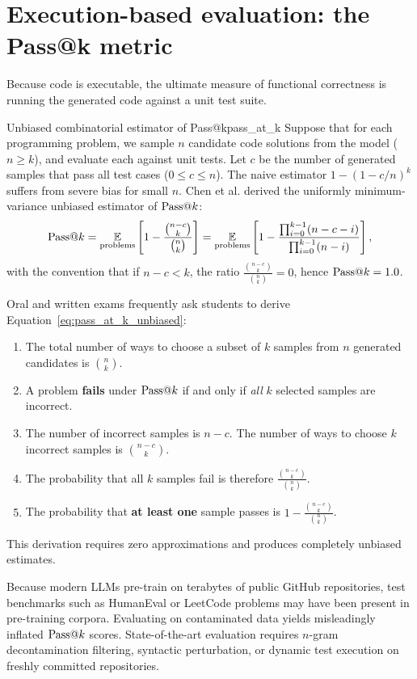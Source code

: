 \documentclass[../../main.tex]{subfiles}
\begin{document}
\section{Execution-based evaluation: the Pass@k metric}
Because code is executable, the ultimate measure of functional correctness is running the generated code against a unit test suite.

\begin{theorem}{Unbiased combinatorial estimator of Pass@k}{pass_at_k}
Suppose that for each programming problem, we sample $n$ candidate code solutions from the model ($n \ge k$), and evaluate each against unit tests. Let $c$ be the number of generated samples that pass all test cases ($0 \le c \le n$).
The naive estimator $1 - (1 - c/n)^k$ suffers from severe bias for small $n$. Chen et al. \citep{chen2021codex} derived the uniformly minimum-variance unbiased estimator of $\mathrm{Pass}@k$:
\begin{equation}
\label{eq:pass_at_k_unbiased}
\mathrm{Pass}@k = \operatorname*{\mathbb{E}}_{\text{problems}} \left[ 1 - \frac{\binom{n - c}{k}}{\binom{n}{k}} \right] = \operatorname*{\mathbb{E}}_{\text{problems}} \left[ 1 - \frac{\prod_{i=0}^{k-1} (n - c - i)}{\prod_{i=0}^{k-1} (n - i)} \right],
\end{equation}
with the convention that if $n - c < k$, the ratio $\frac{\binom{n-c}{k}}{\binom{n}{k}} = 0$, hence $\mathrm{Pass}@k = 1.0$.
\end{theorem}

\begin{examinsight}
Oral and written exams frequently ask students to derive Equation~\eqref{eq:pass_at_k_unbiased}:
\begin{enumerate}
    \item The total number of ways to choose a subset of $k$ samples from $n$ generated candidates is $\binom{n}{k}$.
    \item A problem \textbf{fails} under $\mathrm{Pass}@k$ if and only if \emph{all} $k$ selected samples are incorrect.
    \item The number of incorrect samples is $n - c$. The number of ways to choose $k$ incorrect samples is $\binom{n-c}{k}$.
    \item The probability that all $k$ samples fail is therefore $\frac{\binom{n-c}{k}}{\binom{n}{k}}$.
    \item The probability that \textbf{at least one} sample passes is $1 - \frac{\binom{n-c}{k}}{\binom{n}{k}}$.
\end{enumerate}
This derivation requires zero approximations and produces completely unbiased estimates.
\end{examinsight}

\begin{deepdive}
Because modern LLMs pre-train on terabytes of public GitHub repositories, test benchmarks such as HumanEval or LeetCode problems may have been present in pre-training corpora. Evaluating on contaminated data yields misleadingly inflated $\mathrm{Pass}@k$ scores. State-of-the-art evaluation requires $n$-gram decontamination filtering, syntactic perturbation, or dynamic test execution on freshly committed repositories.
\end{deepdive}
\end{document}
